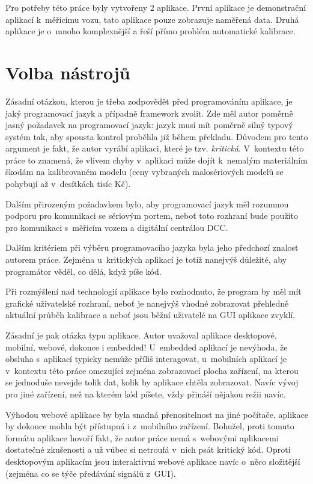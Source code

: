 Pro potřeby této práce byly vytvořeny 2 aplikace. První aplikace je
demonstrační aplikací k~měřicímu vozu, tato aplikace pouze zobrazuje naměřená
data. Druhá aplikace je o~mnoho komplexnější a řeší přímo problém automatické
kalibrace.

\section{Volba nástrojů}
\label{sec:sw-nastroje}

Zásadní otázkou, kterou je třeba zodpovědět před programováním aplikace, je
jaký programovací jazyk a případně framework zvolit. Zde měl autor poměrně
jasný požadavek na programovací jazyk: jazyk musí mít poměrně silný typový
systém tak, aby spousta kontrol proběhla již během překladu. Důvodem pro tento
argument je fakt, že autor vyrábí aplikaci, které je tzv. \textit{kritická}.
V~kontextu této práce to znamená, že vlivem chyby v~aplikaci může dojít
k~nemalým materiálním škodám na kalibrovaném modelu (ceny vybraných
malosériových modelů se pohybují až v~desítkách tisíc Kč).

Dalším přirozeným požadavkem bylo, aby programovací jazyk měl rozumnou podporu
pro komunikaci se sériovým portem, neboť toto rozhraní bude použito pro
komunikaci s~měřicím vozem a digitální centrálou DCC.

Dalším kritériem při výběru programovacího jazyka byla jeho předchozí znalost
autorem práce. Zejména u~kritických aplikací je totiž nanejvýš důležité, aby
programátor věděl, co dělá, když píše kód.

Při rozmýšlení nad technologií aplikace bylo rozhodnuto, že program by měl
mít grafické uživatelské rozhraní, neboť je nanejvýš vhodné zobrazovat přehledně
aktuální průběh kalibrace a neboť jsou běžní uživatelé na GUI aplikace zvyklí.

Zásadní je pak otázka typu aplikace. Autor uvažoval aplikace desktopové,
mobilní, webové, dokonce i embedded! U~embedded aplikací je nevýhoda, že
obsluha s~aplikací typicky nemůže příliš interagovat, u~mobilních aplikací
je v~kontextu této práce omezující zejména zobrazovací plocha zařízení, na
kterou se jednoduše nevejde tolik dat, kolik by aplikace chtěla zobrazovat.
Navíc vývoj pro jiné zařízení, než na kterém kód píšete, vždy přináší nějakou
režii navíc.

Výhodou webové aplikace by byla snadná přenositelnost na jiné počítače,
aplikace by dokonce mohla být přístupná i z~mobilního zařízení. Bohužel, proti
tomuto formátu aplikace hovoří fakt, že autor práce nemá s~webovými aplikacemi
dostatečné zkušenosti a už vůbec si netroufá v~nich psát kritický kód.
Oproti desktopovým aplikacím jsou interaktivní webové aplikace navíc o~něco
složitější (zejména co se týče předávání signálů z~GUI).

